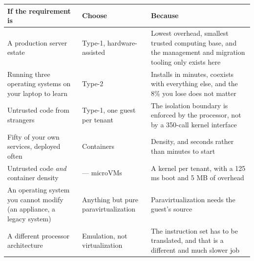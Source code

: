 \begin{longtable}{@{}L{5.0cm}L{4.2cm}L{5.5cm}@{}}
\toprule
{}
\textbf{If the requirement is} & \textbf{Choose} & \textbf{Because} \\
\midrule
\endhead
A production server estate & Type-1, hardware-assisted & Lowest overhead,
smallest trusted computing base, and the management and migration tooling only
exists here \\
Running three operating systems on your laptop to learn & Type-2 & Installs in
minutes, coexists with everything else, and the 8\% you lose does not matter \\
Untrusted code from strangers & Type-1, one guest per tenant & The isolation
boundary is enforced by the processor, not by a 350-call kernel interface \\
Fifty of your own services, deployed often & Containers & Density, and seconds
rather than minutes to start \\
Untrusted code \emph{and} container density &  ---
microVMs & A kernel per tenant, with a 125 ms boot and 5 MB of overhead \\
An operating system you cannot modify (an appliance, a legacy system) & Anything
but pure paravirtualization & Paravirtualization needs the guest's source \\
A different processor architecture & Emulation, not virtualization & The
instruction set has to be translated, and that is a different and much slower
job \\
\bottomrule
\end{longtable}


